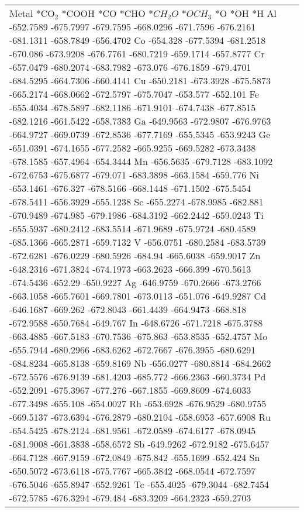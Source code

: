 \begin{table}[h]
    \centering
    \begin{tabular}{lr}
      \hline
      Metal	*CO$_2$	*COOH	*CO	*CHO	*$CH_2O$	*$OCH_3$	*O	*OH	*H
      \hline
      Al	-652.7589	-675.7997	-679.7595	-668.0296	-671.7596	-676.2161	-681.1311	-658.7849	-656.4702
      Co	-654.328	-677.5394	-681.2518	-670.086	-673.9208	-676.7761	-680.7219	-659.1714	-657.8777
      Cr	-657.0479	-680.2074	-683.7982	-673.076	-676.1859	-679.4701	-684.5295	-664.7306	-660.4141
      Cu	-650.2181	-673.3928	-675.5873	-665.2174	-668.0662	-672.5797	-675.7047	-653.577	-652.101
      Fe	-655.4034	-678.5897	-682.1186	-671.9101	-674.7438	-677.8515	-682.1216	-661.5422	-658.7383
      Ga	-649.9563	-672.9807	-676.9763	-664.9727	-669.0739	-672.8536	-677.7169	-655.5345	-653.9243
      Ge	-651.0391	-674.1655	-677.2582	-665.9255	-669.5282	-673.3438	-678.1585	-657.4964	-654.3444
      Mn	-656.5635	-679.7128	-683.1092	-672.6753	-675.6877	-679.071	-683.3898	-663.1584	-659.776
      Ni	-653.1461	-676.327	-678.5166	-668.1448	-671.1502	-675.5454	-678.5411	-656.3929	-655.1238
      Sc	-655.2274	-678.9985	-682.881	-670.9489	-674.985	-679.1986	-684.3192	-662.2442	-659.0243
      Ti	-655.5937	-680.2412	-683.5514	-671.9689	-675.9724	-680.4589	-685.1366	-665.2871	-659.7132
      V	  -656.0751	-680.2584	-683.5739	-672.6281	-676.0229	-680.5926	-684.94		-665.6038	-659.9017
      Zn	-648.2316	-671.3824	-674.1973	-663.2623	-666.399	-670.5613	-674.5436	-652.29	-650.9227
      Ag	-646.9759	-670.2666	-673.2766	-663.1058	-665.7601	-669.7801	-673.0113	-651.076	-649.9287
      Cd	-646.1687	-669.262	-672.8043	-661.4439	-664.9473	-668.818	-672.9588	-650.7684	-649.767
      In	-648.6726	-671.7218	-675.3788	-663.4885	-667.5183	-670.7536	-675.863	-653.8535	-652.4757
      Mo	-655.7944	-680.2966	-683.6262	-672.7667	-676.3955	-680.6291	-684.8234	-665.8138	-659.8169
      Nb	-656.0277	-680.8814	-684.2662	-672.5576	-676.9139	-681.4203	-685.772	-666.2363	-660.3734
      Pd	-652.2091	-675.3967	-677.276	-667.1855	-669.8609	-674.6033	-677.3498	-655.108	-654.0027
      Rh	-653.6928	-676.9529	-680.9755	-669.5137	-673.6394	-676.2879	-680.2104	-658.6953	-657.6908
      Ru	-654.5425	-678.2124	-681.9561	-672.0589	-674.6177	-678.0945	-681.9008	-661.3838	-658.6572
      Sb	-649.9262	-672.9182	-675.6457	-664.7128	-667.9159	-672.0849	-675.842	-655.1699	-652.424
      Sn	-650.5072	-673.6118	-675.7767	-665.3842	-668.0544	-672.7597	-676.5046	-655.8947	-652.9261
      Tc	-655.4025	-679.3044	-682.7454	-672.5785	-676.3294	-679.484	-683.3209	-664.2323	-659.2703

\end{tabular}
\end{table}
